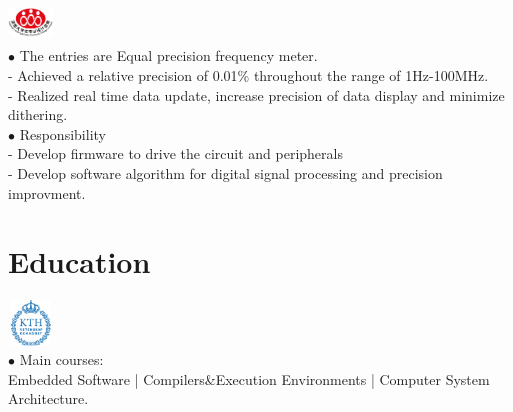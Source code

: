 \documentclass[12pt,a4paper,sans]{moderncv}        %
\begin{document}
\includegraphics[width=1.2cm,height=1cm]{NUEDC.jpg} \vspace{-25pt}\\
\hspace*{1.3cm} 
{
\hspace*{1.3cm} $\bullet$ The entries are Equal precision frequency meter.  \\
\hspace*{1.37cm} - Achieved a relative precision of 0.01\% throughout the range of 1Hz-100MHz.\\
\hspace*{1.37cm} - Realized real time data update, increase precision of data display and minimize dithering.\vspace{3pt}\\
\hspace*{1.3cm} $\bullet$ Responsibility\\
\hspace*{1.37cm} - Develop firmware to drive the circuit and peripherals\\
\hspace*{1.37cm} - Develop software algorithm for digital signal processing and precision improvment.
}

 
\section{Education}
\includegraphics[width=1.2cm,height=1.2cm]{kth.png} \vspace{-25pt}\\
\hspace*{1.3cm}
{
\hspace*{1cm} $\bullet$ Main courses: \\
\hspace*{1.3cm} Embedded Software | Compilers\&Execution Environments | Computer System Architecture.
}
\end{document}
